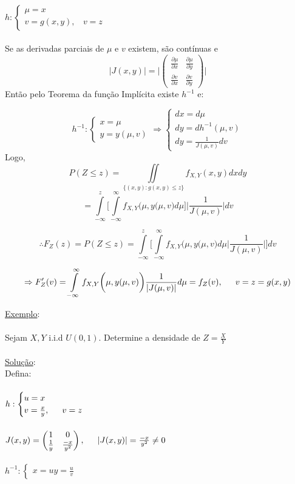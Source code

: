 \documentclass[a4paper,12pt]{article}
\begin{document}
	\\
	$
	h:\begin{cases}
	\mu = x\\
	v=g(x,y), \ \ \ \ v=z
	\end{cases}
	$
	\\
	\\
	Se as derivadas parciais de $\mu$ e $v$ existem, são contínuas e 
	$$
	|J(x,y)| = \bigg|\begin{pmatrix}
	\frac{\partial\mu}{\partial x} & \frac{\partial\mu}{\partial y}\\
	\frac{\partial v}{\partial x}   & \frac{\partial v}{\partial y} 
	\end{pmatrix}\bigg|
	$$
	Então pelo Teorema da função Implícita existe $h^{-1}$ e:
	
	$$
	h^{-1}:\begin{cases}
	x=\mu\\
	y=y(\mu,v)
	\end{cases}
	\Rightarrow
	\begin{cases}
	dx=d\mu\\
	dy = dh^{-1}(\mu,v)\\
	dy=\frac{1}{J(\mu,v)}dv
	\end{cases}
	 $$
	Logo,
	$$P(Z\le z)= 
	\iint\limits_{\{(x,y): g(x,y)\le z \}}
	f_{X,Y}(x,y)dxdy
	 $$
	 $$
	 =\int\limits_{-\infty}^{z}\bigg[\int\limits_{-\infty}^{\infty}f_{X,Y}\bigg(\mu,y(\mu,v\bigg)d\mu\bigg] \bigg|\frac{1}{J(\mu,v)}\bigg|dv
	 $$
	 
	 $$
	\therefore F_Z(z)=P(Z\le z)	= \int\limits_{-\infty}^{z}\bigg[\int\limits_{-\infty}^{\infty}f_{X,Y}\bigg(\mu,y(\mu,v\bigg)d\mu \bigg|\frac{1}{J(\mu,v)}\bigg|\bigg]dv
	 $$
	 
	 $$
	 \Rightarrow F_Z'(v) = \int\limits_{-\infty}^{\infty}f_{X,Y}\bigg(\mu,y(\mu,v)\bigg)
	 \frac{1}{|J(\mu,v)|}d\mu=f_Z(v), \indent v=z=g(x,y)
	 $$
	
	\newpage
	
	\underline{Exemplo}:\\
	\\
	Sejam $X,Y$ i.i.d $U(0,1)$. Determine a densidade de $Z=\frac{X}{Y}$\\
	\\
	\underline{Solução}:\\
	Defina:\\
	\\
	$h:
	\begin{cases}
		u=x\\
		v=\frac{x}{y}, \indent v=z
	\end{cases} 
	$\\
	\\
	$J(x,y)=\begin{pmatrix}
	1 & 0\\
	\frac{1}{y} & \frac{-x}{y^2}
	\end{pmatrix}
	,
	\indent |J(x,y)| = \frac{-x}{y^2}\ne 0
	$
	\\
	\\
	$
	h^{-1}:\begin{cases}
	x=u
	y=\frac{u}{v}
	\end{cases}
	$\\
	
\end{document}
